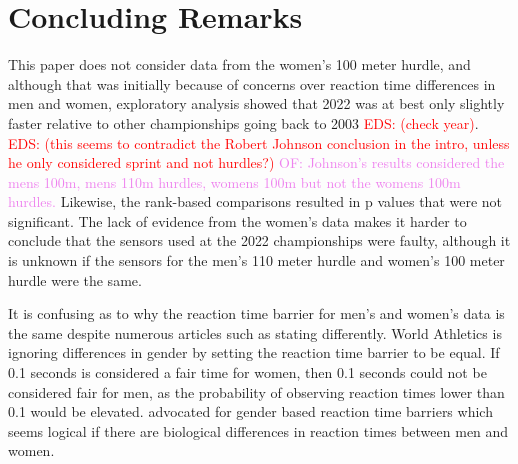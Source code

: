 \documentclass[12pt, letterpaper, titlepage]{article}
\newcommand{\eds}[1]{\textcolor{red}{EDS: (#1)}}
\newcommand{\of}[1]{\textcolor{violet}{OF: #1}}
\begin{document}
\section{Concluding Remarks}\label{sec:concludingremarks}



This paper does not consider data from the women's 100 meter hurdle, and although
that was initially because of concerns over reaction time differences in men and
women, exploratory analysis showed that 2022 was at best only
slightly faster relative to other championships going back to 2003 
\eds{check year}. \eds{this seems to contradict the Robert Johnson conclusion in 
the intro, unless he only considered sprint and not hurdles?} \of{Johnson's
results considered the mens 100m, mens 110m hurdles, womens 100m but not the 
womens 100m hurdles.} Likewise, the rank-based comparisons resulted in p values
that were not significant.  The lack of evidence from the women's data makes it 
harder to conclude that the sensors used at the 2022 championships were faulty, 
although it is unknown if the sensors for the men's 110 meter hurdle and women's
100 meter hurdle were the same.


It is confusing as to why the reaction time barrier for men's and women's data
is the same despite numerous articles such as \citep[e.g.,][]{lipps2011implications, 
babicc2009reaction, panoutsakopoulos2020gender} stating differently.  World
Athletics is ignoring differences in gender by setting the reaction time barrier
to be equal. If 0.1 seconds is considered a fair time for women, then 0.1 seconds
could not be considered fair for men, as the probability of observing reaction
times lower than 0.1 would be elevated.  \citet{brosnan2017effects} advocated
for gender based reaction time barriers which seems logical if there are biological
differences in reaction times between men and women.
\end{document}
